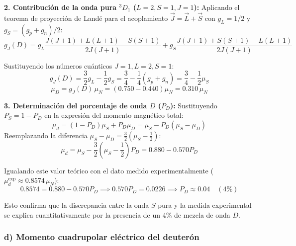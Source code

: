 \begin{problema}
\textbf{2. Contribución de la onda pura ${}^3D_1$ ($L=2, S=1, J=1$):}
Aplicando el teorema de proyección de Landé para el acoplamiento $\vec{J} = \vec{L} + \vec{S}$ con $g_L = 1/2$ y $g_S = (g_p + g_n)/2$:
\begin{equation}
g_J(D) = g_L \frac{J(J+1) + L(L+1) - S(S+1)}{2J(J+1)} + g_S \frac{J(J+1) + S(S+1) - L(L+1)}{2J(J+1)}
\end{equation}

Sustituyendo los números cuánticos $J=1, L=2, S=1$:
\begin{equation}
g_J(D) = \frac{3}{2} g_L - \frac{1}{2} g_S = \frac{3}{4} - \frac{1}{4}(g_p + g_n) = \frac{3}{4} - \frac{1}{2}\mu_S
\end{equation}
\begin{equation}
\mu_D = g_J(D) \, \mu_N = \left( 0.750 - 0.440 \right) \mu_N = 0.310 \, \mu_N
\end{equation}

\textbf{3. Determinación del porcentaje de onda $D$ ($P_D$):}
Sustituyendo $P_S = 1 - P_D$ en la expresión del momento magnético total:
\begin{equation}
\mu_d = (1 - P_D) \mu_S + P_D \mu_D = \mu_S - P_D (\mu_S - \mu_D)
\end{equation}
Reemplazando la diferencia $\mu_S - \mu_D = \frac{3}{2} \left( \mu_S - \frac{1}{2} \right)$:
\begin{equation}
\mu_d = \mu_S - \frac{3}{2} \left( \mu_S - \frac{1}{2} \right) P_D = 0.880 - 0.570 P_D
\end{equation}

Igualando este valor teórico con el dato medido experimentalmente ($\mu_d^{\text{exp}} \approx 0.8574 \, \mu_N$):
\begin{equation}
0.8574 = 0.880 - 0.570 P_D \implies 0.570 P_D = 0.0226 \implies P_D \approx 0.04 \quad (4\%)
\end{equation}

Esto confirma que la discrepancia entre la onda $S$ pura y la medida experimental se explica cuantitativamente por la presencia de un $4\%$ de mezcla de onda $D$.

\begin{center}
\end{center}

\subsubsection*{d) Momento cuadrupolar eléctrico del deuterón}


\end{problema}
